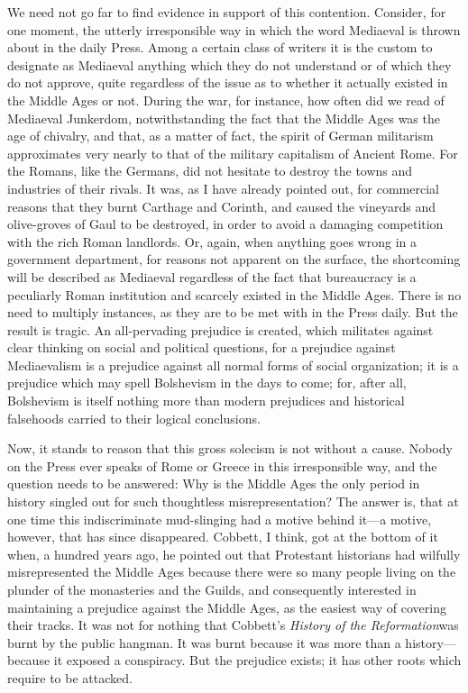 \documentclass{book}
\begin{document}
We need not go far to find evidence in support of this contention. Consider, for one moment, the utterly irresponsible way in which the word Mediaeval is thrown about in the daily Press. Among a certain class of writers it is the custom to designate as Mediaeval anything which they do not understand or of which they do not approve, quite regardless of the issue as to whether it actually existed in the Middle Ages or not. During the war, for instance, how often did we read of Mediaeval Junkerdom, notwithstanding the fact that the Middle Ages was the age of chivalry, and that, as a matter of fact, the spirit of German militarism approximates very nearly to that of the military capitalism of Ancient Rome. For the Romans, like the Germans, did not hesitate to destroy the towns and industries of their rivals. It was, as I have already pointed out, for commercial reasons that they burnt Carthage and Corinth, and caused the vineyards and olive-groves of Gaul to be destroyed, in order to avoid a damaging competition with the rich Roman landlords. Or, again, when anything goes wrong in a government department, for reasons not apparent on the surface, the shortcoming will be described as Mediaeval regardless of the fact that bureaucracy is a peculiarly Roman institution and scarcely existed in the Middle Ages. There is no need to multiply instances, as they are to be met with in the Press daily. But the result is tragic. An all-pervading prejudice is created, which militates against clear thinking on social and political questions, for a prejudice against Mediaevalism is a prejudice against all normal forms of social organization; it is a prejudice which may spell Bolshevism in the days to come; for, after all, Bolshevism is itself nothing more than modern prejudices and historical falsehoods carried to their logical conclusions.

Now, it stands to reason that this gross solecism is not without a cause. Nobody on the Press ever speaks of Rome or Greece in this irresponsible way, and the question needs to be answered: Why is the Middle Ages the only period in history singled out for such thoughtless misrepresentation? The answer is, that at one time this indiscriminate mud-slinging had a motive behind it—a motive, however, that has since disappeared. Cobbett, I think, got at the bottom of it when, a hundred years ago, he pointed out that Protestant historians had wilfully misrepresented the Middle Ages because there were so many people living on the plunder of the monasteries and the Guilds, and consequently interested in maintaining a prejudice against the Middle Ages, as the easiest way of covering their tracks. It was not for nothing that Cobbett’s \emph{History of the Reformation}\footnotemark[1] was burnt by the public hangman. It was burnt because it was more than a history—because it exposed a conspiracy. But the prejudice exists; it has other roots which require to be attacked.
\end{document}
